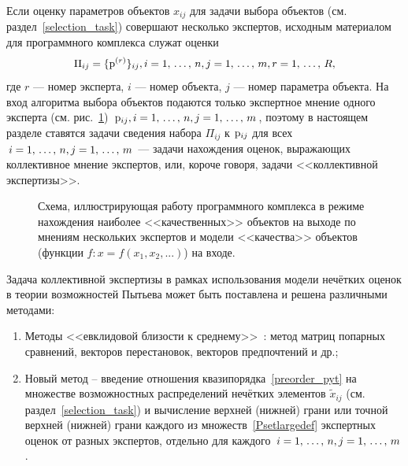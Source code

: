 \label{collective_global}

Если оценку параметров объектов $x_{ij}$ для задачи выбора объектов (см. раздел~\ref{selection_task}) совершают несколько экспертов, исходным материалом для программного комплекса служат оценки 
\begin{equation}
\label{Psetlargedef}
	\Pi_{ij} = \{{\mathrm{p}}^{(r)}\}_{ij}, i = 1,\, \ldots,\, n, j = 1,\, \ldots,\, m, r = 1,\, \ldots,\, R, 
\end{equation}
где $r$ --- номер эксперта, $i$ --- номер объекта, $j$ --- номер параметра объекта. На вход алгоритма выбора объектов подаются только экспертное  мнение одного эксперта (см. рис.~\ref{ris:program_global}) ${\mathrm{p}}_{ij},  i = 1,\, \ldots,\, n, j = 1,\, \ldots,\, m$,  поэтому в настоящем разделе ставятся задачи сведения набора $\Pi_{ij}$ к ${\mathrm{p}}_{ij}$ для всех $i = 1,\, \ldots,\, n, j= 1,\, \ldots,\, m$ --- задачи нахождения  оценок, выражающих коллективное мнение экспертов, или, короче говоря, задачи <<коллективной экспертизы>>. 

\begin{figure}[h]
\caption{\small Схема, иллюстрирующая работу программного комплекса в режиме нахождения наиболее <<качественных>> объектов на выходе по мнениям нескольких экспертов и модели <<качества>> объектов (функции $f: x = f(x_1, x_2, ...)$) на входе. }
\label{ris:program_global}
\end{figure}

Задача коллективной экспертизы в рамках использования модели нечётких оценок в теории возможностей Пытьева может быть поставлена и решена различными методами:
	\begin{enumerate}
		\item Методы <<евклидовой близости к среднему>>~\cite{pytyev_experts}: метод матриц попарных сравнений, векторов перестановок, векторов предпочтений и др.;
		\item Новый метод -- введение отношения квазипорядка~\ref{preorder_pyt}  на множестве возможностных распределений нечётких  элементов $\tilde x_{ij}$ (см. раздел~\ref{selection_task}) и вычисление верхней (нижней) грани или точной верхней (нижней) грани каждого из множеств~\ref{Psetlargedef} экспертных оценок от разных экспертов, отдельно для каждого $i = 1,\, \ldots,\, n, j= 1,\, \ldots,\, m$.
	\end{enumerate} 
	

